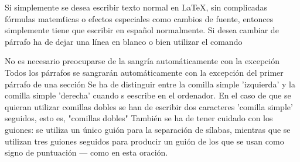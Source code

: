 \documentclass[a4paper,10pt]{letter}
\begin{document}
 Si simplemente se desea escribir texto normal en LaTeX,
 sin complicadas f\'ormulas matem\'ticas o efectos especiales 
 como cambios de fuente, entonces simplemente tiene que escribir
 en espa\~nol normalmente.
 Si desea cambiar de párrafo ha de dejar una línea en blanco o bien
 utilizar el comando \par
 No es necesario preocuparse de la sangría automáticamente con la excepción
 Todos los párrafos se sangrarán automáticamente con la excepción
 del primer párrafo de una sección
 Se ha de distinguir entre la comilla simple 'izquierda'
 y la comilla simple 'derecha' cuando s eescribe en el ordenador.
 En el caso de que se quieran utilizar comillas dobles se han de 
 escribir dos caracteres 'comilla simple' seguidos, esto es, 
 "comillas dobles"
 También se ha de tener cuidado con los guiones: se utiliza un único
 guión para la separación de sílabas, mientras que se utilizan
 tres guiones seguidos para producir un guión de los que se usan 
 como signo de puntuación --- como en esta oración.
\end{document}
